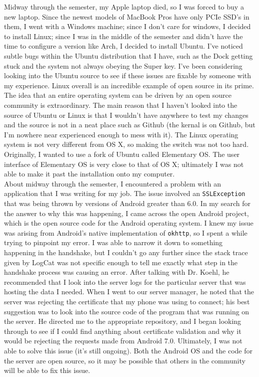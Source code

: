 \documentclass[12pt]{article}
\begin{document}
Midway through the semester, my Apple laptop died, so I was forced to buy a new laptop. Since the newest models of MacBook Pros have only PCIe SSD's in them, I went with a Windows machine; since I don't care for windows, I decided to install Linux; since I was in the middle of the semester and didn't have the time to configure a version like Arch, I decided to install Ubuntu. I've noticed subtle bugs within the Ubuntu distribution that I have, such as the Dock getting stuck and the system not always obeying the Super key. I've been considering looking into the Ubuntu source to see if these issues are fixable by someone with my experience. Linux overall is an incredible example of open source in its prime. The idea that an entire operating system can be driven by an open source community is extraordinary. The main reason that I haven't looked into the source of Ubuntu or Linux is that I wouldn't have anywhere to test my changes and the source is not in a neat place such as Github (the kernal is on Github, but I'm nowhere near experienced enough to mess with it). The Linux operating system is not very different from OS X, so making the switch was not too hard. Originally, I wanted to use a fork of Ubuntu called Elementary OS. The user interface of Elementary OS is very close to that of OS X; ultimately I was not able to make it past the installation onto my computer.\\

About midway through the semester, I encountered a problem with an application that I was writing for my job. The issue involved an \texttt{SSLException} that was being thrown by versions of Android greater than 6.0. In my search for the answer to why this was happening, I came across the open Android project, which is the open source code for the Android operating system. I knew my issue was arising from Android's native implementation of \texttt{okhttp}, so I spent a while trying to pinpoint my error. I was able to narrow it down to something happening in the handshake, but I couldn't go any further since the stack trace given by LogCat was not specific enough to tell me exactly what step in the handshake process was causing an error. After talking with Dr. Koehl, he recommended that I look into the server logs for the particular server that was hosting the data I needed. When I went to our server manager, he noted that the server was rejecting the certificate that my phone was using to connect; his best suggestion was to look into the source code of the program that was running on the server. He directed me to the appropriate repository, and I began looking through to see if I could find anything about certificate validation and why it would be rejecting the requests made from Android 7.0. Ultimately, I was not able to solve this issue (it's still ongoing). Both the Android OS and the code for the server are open source, so it may be possible that others in the community will be able to fix this issue.\\
\end{document}
